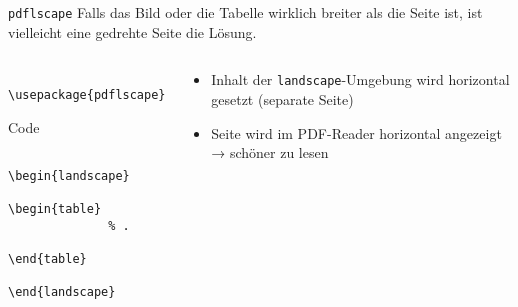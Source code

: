 \begin{frame}[fragile]{\texttt{pdflscape}}
  Falls das Bild oder die Tabelle wirklich breiter als die Seite ist, ist vielleicht eine gedrehte Seite die Lösung.
  \begin{columns}[onlytextwidth, t]
    \begin{column}{0.50\textwidth}
      \begin{Packages}
        \begin{lstlisting}
          \usepackage{pdflscape}
        \end{lstlisting}
      \end{Packages}
      \begin{tblock}{Code}
        \begin{lstlisting}
          \begin{landscape}
            \begin{table}
              % .
            \end{table}
          \end{landscape}
        \end{lstlisting}
      \end{tblock}
    \end{column}
    \begin{column}{0.46\textwidth}
      \begin{itemize}
        \item Inhalt der \texttt{landscape}-Umgebung wird horizontal gesetzt (separate Seite)
        \item Seite wird im PDF-Reader horizontal angezeigt → schöner zu lesen
      \end{itemize}
    \end{column}
  \end{columns}
\end{frame}

